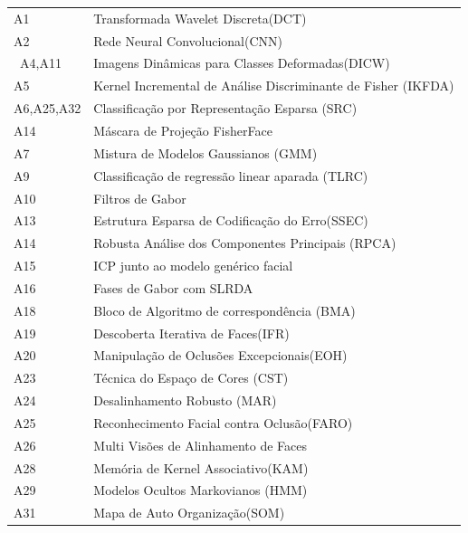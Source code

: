 \begin{quadro}[H]
\begin{tabular}{p{1.2in} p{4.2in} }
A1& Transformada Wavelet Discreta(DCT) \nomenclature{DCT}{Discrete Wavelet Transform} \\
A2 & Rede Neural Convolucional(CNN) \nomenclature{CNN}{Convolucional Neural NetWork}   \\\
A4,A11& Imagens Dinâmicas para Classes Deformadas(DICW) \nomenclature{DICW}{Dynamic image to class Warping}\\
A5 & Kernel Incremental de Análise Discriminante de Fisher (IKFDA)  \\
A6,A25,A32 & Classificação por Representação Esparsa (SRC)  \nomenclature{SRC}{Sparse Representation  Classification} \\
A14 & Máscara de Projeção FisherFace\\
A7 & Mistura de Modelos Gaussianos (GMM) \nomenclature{GCC}{Gaussian Mixture Models} \\
A9 & Classificação de regressão linear aparada (TLRC) \nomenclature{TLRC}{trimmed linear regression
classification} \\
A10 & Filtros de Gabor\\
A13 & Estrutura Esparsa de Codificação do Erro(SSEC) \nomenclature{SSEC}{Structured Sparse Error Coding}\\  
A14 & Robusta Análise dos Componentes Principais (RPCA) \nomenclature{RPCA}{Robust Principal Component Analisys} \\
A15 & ICP junto ao modelo genérico facial\\
A16 & Fases de Gabor com SLRDA\\
A18 &  Bloco de Algoritmo de correspondência (BMA) \nomenclature{BMA}{Block Matching Algorithm}\\
A19 & Descoberta Iterativa de Faces(IFR) \nomenclature{IFR}{Iterative Face Recovery}\\
A20& Manipulação de Oclusões Excepcionais(EOH) \nomenclature{EOH}{Exceptional Occlusion Handling}\\
A23 & Técnica do Espaço de Cores (CST) \nomenclature{CST}{Color Space Technique}\\
A24 & Desalinhamento Robusto (MAR)\\
A25 & Reconhecimento Facial contra Oclusão(FARO)\nomenclature{FARO}{Face Recognition Against Occlusion}\\
A26 & Multi Visões de Alinhamento de Faces \\
A28 & Memória de Kernel Associativo(KAM) \nomenclature{KAM}{Kernel Associative Memory}\\
A29 & Modelos Ocultos Markovianos (HMM) \nomenclature{HMM}{Hidden Markov Models}\\
A31 & Mapa de Auto Organização(SOM) \nomenclature{SOM}{Self Organizaton Maps}\\


\end{tabular}
\end{quadro}
